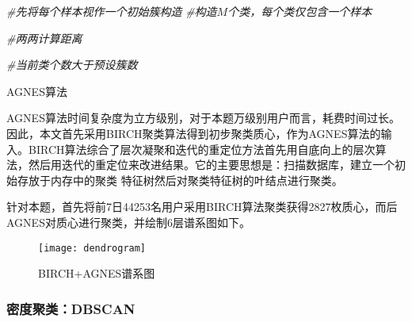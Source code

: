 \documentclass[withoutpreface,bwprint]{cumcmthesis}
\begin{document}
\IncMargin{1em}
\begin{algorithm}   

    \BlankLine

    \BlankLine
    \emph{\#先将每个样本视作一个初始簇构造}\;
    \emph{\#构造$M$个类，每个类仅包含一个样本}\;

    \BlankLine
    \emph{\#两两计算距离}\;

    \BlankLine
    \emph{\#当前类个数大于预设簇数}\;
    \caption{AGNES算法}
\end{algorithm}
\DecMargin{1em}

AGNES算法时间复杂度为立方级别，对于本题万级别用户而言，耗费时间过长。因此，本文首先采用BIRCH\cite{birch}聚类算法得到初步聚类质心，作为AGNES算法的输入。BIRCH算法综合了层次凝聚和迭代的重定位方法首先用自底向上的层次算法，然后用迭代的重定位来改进结果。它的主要思想是：扫描数据库，建立一个初始存放于内存中的聚类
特征树然后对聚类特征树的叶结点进行聚类\cite{birch2}。

针对本题，首先将前7日44253名用户采用BIRCH算法聚类获得2827枚质心，而后AGNES对质心进行聚类，并绘制6层谱系图如下。

\begin{figure}[!htbp]
    \centering
    \texttt{[image: dendrogram]}
    \caption{BIRCH+AGNES谱系图}
    \label{fig:010}
\end{figure}

\subsubsection{密度聚类：DBSCAN}
\end{document}
